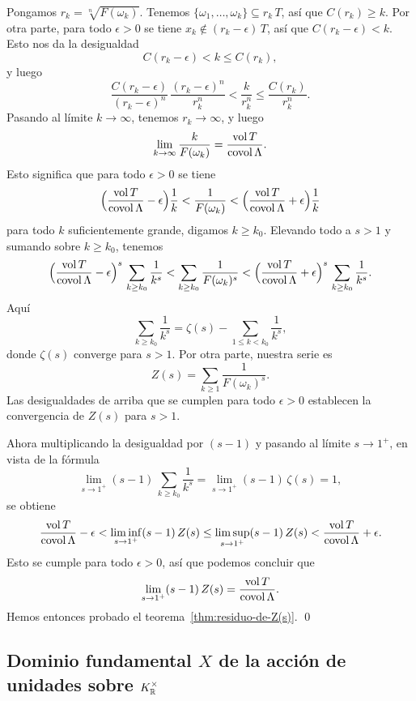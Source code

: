 Pongamos $r_k = \sqrt[n]{F (\omega_k)}$. Tenemos
$\{ \omega_1, \ldots, \omega_k \} \subseteq r_k\,T$, así que $C (r_k) \ge k$.
Por otra parte, para todo $\epsilon > 0$ se tiene
$x_k \notin (r_k - \epsilon)\,T$, así que $C (r_k - \epsilon) < k$. Esto nos
da la desigualdad
$$C (r_k - \epsilon) < k \le C (r_k),$$
y luego
$$\frac{C (r_k - \epsilon)}{(r_k-\epsilon)^n}\,\frac{(r_k - \epsilon)^n}{r_k^n} < \frac{k}{r_k^n} \le \frac{C (r_k)}{r_k^n}.$$
Pasando al límite $k \to \infty$, tenemos $r_k \to \infty$, y luego
$$\lim_{k\to\infty} \frac{k}{F (\omega_k)} = \frac{\operatorname{vol} T}{\operatorname{covol} \Lambda}.$$
Esto significa que para todo $\epsilon > 0$ se tiene
\[ \Bigl(\frac{\operatorname{vol} T}{\operatorname{covol} \Lambda} - \epsilon\Bigr)\frac{1}{k}
   < \frac{1}{F (\omega_k)}
   < \Bigl(\frac{\operatorname{vol} T}{\operatorname{covol} \Lambda} + \epsilon\Bigr)\frac{1}{k} \]
para todo $k$ suficientemente grande, digamos $k \ge k_0$. Elevando todo a $s > 1$
y sumando sobre $k\ge k_0$, tenemos
\[ \Bigl(\frac{\operatorname{vol} T}{\operatorname{covol} \Lambda} - \epsilon\Bigr)^s\,\sum_{k\ge k_0} \frac{1}{k^s}
   < \sum_{k\ge k_0} \frac{1}{F (\omega_k)^s}
   < \Bigl(\frac{\operatorname{vol} T}{\operatorname{covol} \Lambda} + \epsilon\Bigr)^s\,\sum_{k\ge k_0} \frac{1}{k^s}. \]
Aquí
$$\sum_{k\ge k_0} \frac{1}{k^s} = \zeta (s) - \sum_{1\le k < k_0} \frac{1}{k^s},$$
donde $\zeta (s)$ converge para $s > 1$. Por otra parte, nuestra serie es
$$Z (s) = \sum_{k\ge 1} \frac{1}{F (\omega_k)^s}.$$
Las desigualdades de arriba que se cumplen para todo $\epsilon > 0$ establecen
la convergencia de $Z (s)$ para $s > 1$.

Ahora multiplicando la desigualdad por $(s - 1)$ y pasando al límite
$s \to 1^+$, en vista de la fórmula
$$\lim_{s\to 1^+} (s-1)\,\sum_{k\ge k_0} \frac{1}{k^s} = \lim_{s\to 1^+} (s-1)\,\zeta(s) = 1,$$
se obtiene
\[ \frac{\operatorname{vol} T}{\operatorname{covol} \Lambda} - \epsilon
   < \liminf_{s\to 1^+} (s-1)\,Z(s) \le \limsup_{s\to 1^+} (s-1)\,Z(s)
   < \frac{\operatorname{vol} T}{\operatorname{covol} \Lambda} + \epsilon. \]
Esto se cumple para todo $\epsilon > 0$, así que podemos concluir que
$$\lim_{s\to 1^+} (s-1)\,Z (s) = \frac{\operatorname{vol} T}{\operatorname{covol} \Lambda}.$$
Hemos entonces probado el teorema~\ref{thm:residuo-de-Z(s)}. \qed


\subsection{Dominio fundamental $X$ de la acción de unidades sobre \texorpdfstring{$K_{\mathbb{R}}^\times$}{Kℝ*}}
\label{sec:dominio-fundamental-X}

